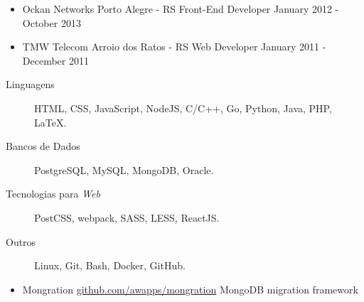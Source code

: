 \documentclass[letterpaper,11pt]{article}
\begin{document}
\begin{itemize}
        \item
            \ressubheading
                {Ockan Networks}
                {Porto Alegre - RS}
                {Front-End Developer}
                {January 2012 - October 2013}
            \begin{itemize}
            \end{itemize}

        \item
            \ressubheading
                {TMW Telecom}
                {Arroio dos Ratos - RS}
                {Web Developer}
                {January 2011 - December 2011}
            \begin{itemize}
            \end{itemize}
    \end{itemize}

    \begin{description}
        \item[Linguagens]
            HTML, CSS, JavaScript, NodeJS, C/C++, Go, Python, Java, PHP, \LaTeX.
        \item[Bancos de Dados]
            PostgreSQL, MySQL, MongoDB, Oracle.
        \item[Tecnologias para \textit{Web}]
            PostCSS, webpack, SASS, LESS, ReactJS.
        \item[Outros]
            Linux, Git, Bash, Docker, GitHub.
    \end{description}

    \begin{itemize}
        \item
            \ressubheading
                {Mongration}
                {\href{https://github.com/awapps/mongration}{github.com/awapps/mongration}}
                {MongoDB migration framework}
                {}
    \end{itemize}
\end{document}

